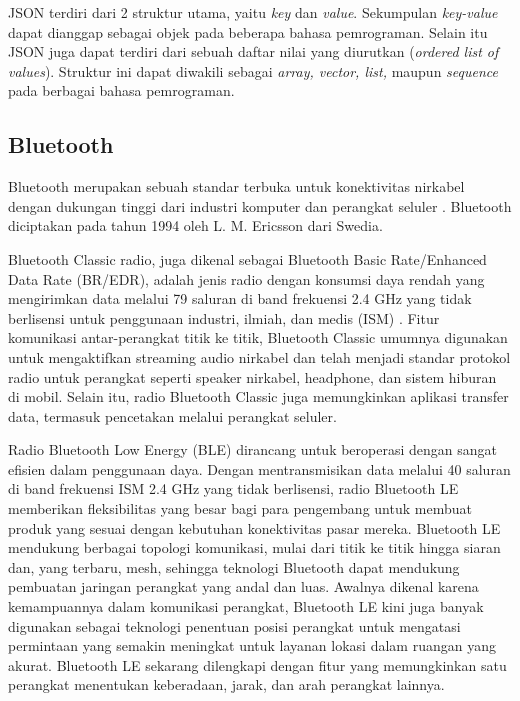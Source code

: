 JSON terdiri dari 2 struktur utama, yaitu \emph{key} dan \emph{value}. Sekumpulan \emph{key-value} dapat dianggap sebagai objek pada beberapa bahasa pemrograman. Selain itu JSON juga dapat terdiri dari sebuah daftar nilai yang diurutkan (\emph{ordered list of values}). Struktur ini dapat diwakili sebagai \emph{array, vector, list,} maupun \emph{sequence} pada berbagai bahasa pemrograman.

\subsection{Bluetooth}

Bluetooth merupakan sebuah standar terbuka untuk konektivitas nirkabel dengan dukungan tinggi dari industri komputer dan perangkat seluler \parencite{sairam2002bluetooth}. Bluetooth diciptakan pada tahun 1994 oleh L. M. Ericsson dari Swedia. 

Bluetooth Classic radio, juga dikenal sebagai Bluetooth Basic Rate/Enhanced Data Rate (BR/EDR), adalah jenis radio dengan konsumsi daya rendah yang mengirimkan data melalui 79 saluran di band frekuensi 2.4 GHz yang tidak berlisensi untuk penggunaan industri, ilmiah, dan medis (ISM) \parencite{SIG_2024}. Fitur komunikasi antar-perangkat titik ke titik, Bluetooth Classic umumnya digunakan untuk mengaktifkan streaming audio nirkabel dan telah menjadi standar protokol radio untuk perangkat seperti speaker nirkabel, headphone, dan sistem hiburan di mobil. Selain itu, radio Bluetooth Classic juga memungkinkan aplikasi transfer data, termasuk pencetakan melalui perangkat seluler.

Radio Bluetooth Low Energy (BLE) dirancang untuk beroperasi dengan sangat efisien dalam penggunaan daya. Dengan mentransmisikan data melalui 40 saluran di band frekuensi ISM 2.4 GHz yang tidak berlisensi, radio Bluetooth LE memberikan fleksibilitas yang besar bagi para pengembang untuk membuat produk yang sesuai dengan kebutuhan konektivitas pasar mereka. Bluetooth LE mendukung berbagai topologi komunikasi, mulai dari titik ke titik hingga siaran dan, yang terbaru, mesh, sehingga teknologi Bluetooth dapat mendukung pembuatan jaringan perangkat yang andal dan luas. Awalnya dikenal karena kemampuannya dalam komunikasi perangkat, Bluetooth LE kini juga banyak digunakan sebagai teknologi penentuan posisi perangkat untuk mengatasi permintaan yang semakin meningkat untuk layanan lokasi dalam ruangan yang akurat. Bluetooth LE sekarang dilengkapi dengan fitur yang memungkinkan satu perangkat menentukan keberadaan, jarak, dan arah perangkat lainnya.

